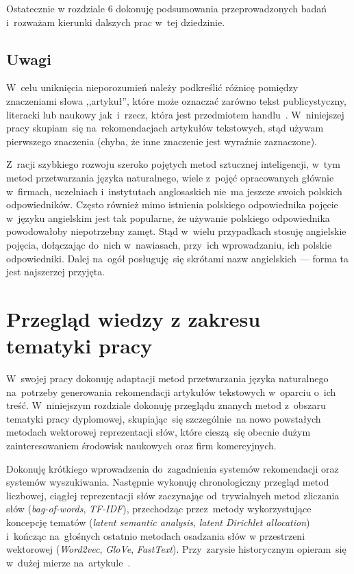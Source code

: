\documentclass[pl]{minipw} %
\begin{document}
Ostatecznie w rozdziale 6 dokonuję podsumowania przeprowadzonych badań i~rozważam kierunki dalszych prac w~tej dziedzinie.

\section{Uwagi}
W~celu uniknięcia nieporozumień należy podkreślić różnicę pomiędzy znaczeniami słowa ,,artykuł'', które może oznaczać zarówno tekst publicystyczny, literacki lub naukowy jak~i~rzecz, która jest przedmiotem handlu~\cite{slownik}. W~niniejszej pracy skupiam~się na~rekomendacjach artykułów tekstowych, stąd używam pierwszego znaczenia (chyba, że inne znaczenie jest wyraźnie zaznaczone).

Z~racji szybkiego rozwoju szeroko pojętych metod sztucznej inteligencji, w~tym metod przetwarzania języka naturalnego, wiele z~pojęć opracowanych głównie w~firmach, uczelniach i~instytutach anglosaskich nie~ma jeszcze swoich polskich odpowiedników. Często również mimo istnienia polskiego odpowiednika pojęcie w~języku angielskim jest tak popularne, że używanie polskiego odpowiednika powodowałoby niepotrzebny zamęt. Stąd w~wielu przypadkach stosuję angielskie pojęcia, dołączając do~nich w~nawiasach, przy~ich wprowadzaniu, ich polskie odpowiedniki. Dalej na~ogół posługuję~się skrótami nazw angielskich --- forma ta jest najszerzej przyjęta. 

\chapter{Przegląd wiedzy z zakresu tematyki pracy}
W~swojej pracy dokonuję adaptacji metod przetwarzania języka naturalnego na~potrzeby generowania rekomendacji artykułów tekstowych w~oparciu o~ich treść. W~niniejszym rozdziale dokonuję przeglądu znanych metod z~obszaru tematyki pracy dyplomowej, skupiając~się szczególnie~na nowo powstałych metodach wektorowej reprezentacji słów, które cieszą~się obecnie dużym zainteresowaniem środowisk naukowych oraz firm komercyjnych. 

Dokonuję krótkiego wprowadzenia do~zagadnienia systemów rekomendacji oraz systemów wyszukiwania. Następnie wykonuję chronologiczny przegląd metod liczbowej, ciągłej reprezentacji słów zaczynając od~trywialnych metod zliczania słów (\textit{bag-of-words}, \textit{TF-IDF}), przechodząc przez~metody wykorzystujące koncepcję tematów (\textit{latent semantic analysis}, \textit{latent Dirichlet allocation}) i~kończąc na~głośnych ostatnio metodach osadzania słów w przestrzeni wektorowej (\textit{Word2vec}, \textit{GloVe}, \textit{FastText}). Przy~zarysie historycznym opieram~się w~dużej mierze na~artykule~\cite{aylien}.
\end{document}
